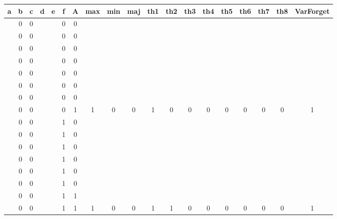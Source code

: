 \begin{table}[!tb]
    \centering
    \begin{tabular}{|c|c|c|c|c|c|c|c|c|c|c|c|c|c|c|c|c|c|c|}
        \hline
        \textbf{a} & \textbf{b} & \textbf{c} & \textbf{d} & \textbf{e} & \textbf{f} & \textbf{A} & \textbf{max} & \textbf{min} & \textbf{maj} & \textbf{th1} & \textbf{th2} & \textbf{th3} & \textbf{th4} & \textbf{th5} & \textbf{th6} & \textbf{th7} & \textbf{th8} & \textbf{VarForget} \\ \hline
        \rowcolor{gray!40}  & 0 & 0 &  &  & 0 & 0 &  &  &  &  &  &  &  &  &  &  &  &  \\ \hline
        \rowcolor{gray!40}  & 0 & 0 &  &  & 0 & 0 &  &  &  &  &  &  &  &  &  &  &  &  \\ \hline
        \rowcolor{gray!40}  & 0 & 0 &  &  & 0 & 0 &  &  &  &  &  &  &  &  &  &  &  &  \\ \hline
        \rowcolor{gray!40}  & 0 & 0 &  &  & 0 & 0 &  &  &  &  &  &  &  &  &  &  &  &  \\ \hline
        \rowcolor{gray!40}  & 0 & 0 &  &  & 0 & 0 &  &  &  &  &  &  &  &  &  &  &  &  \\ \hline
        \rowcolor{gray!40}  & 0 & 0 &  &  & 0 & 0 &  &  &  &  &  &  &  &  &  &  &  &  \\ \hline
        \rowcolor{gray!40}  & 0 & 0 &  &  & 0 & 0 &  &  &  &  &  &  &  &  &  &  &  &  \\ \hline
        \rowcolor{gray!40}  & 0 & 0 &  &  & 0 & 1 & 1 & 0 & 0 & 1 & 0 & 0 & 0 & 0 & 0 & 0 & 0 & 1 \\ \hline
        \rowcolor{blue!40}  & 0 & 0 &  &  & 1 & 0 &  &  &  &  &  &  &  &  &  &  &  &  \\ \hline
        \rowcolor{blue!40}  & 0 & 0 &  &  & 1 & 0 &  &  &  &  &  &  &  &  &  &  &  &  \\ \hline
        \rowcolor{blue!40}  & 0 & 0 &  &  & 1 & 0 &  &  &  &  &  &  &  &  &  &  &  &  \\ \hline
        \rowcolor{blue!40}  & 0 & 0 &  &  & 1 & 0 &  &  &  &  &  &  &  &  &  &  &  &  \\ \hline
        \rowcolor{blue!40}  & 0 & 0 &  &  & 1 & 0 &  &  &  &  &  &  &  &  &  &  &  &  \\ \hline
        \rowcolor{blue!40}  & 0 & 0 &  &  & 1 & 0 &  &  &  &  &  &  &  &  &  &  &  &  \\ \hline
        \rowcolor{blue!40}  & 0 & 0 &  &  & 1 & 1 &  &  &  &  &  &  &  &  &  &  &  &  \\ \hline
        \rowcolor{blue!40}  & 0 & 0 &  &  & 1 & 1 & 1 & 0 & 0 & 1 & 1 & 0 & 0 & 0 & 0 & 0 & 0 & 1 \\ \hline

\end{tabular}
\end{table}
